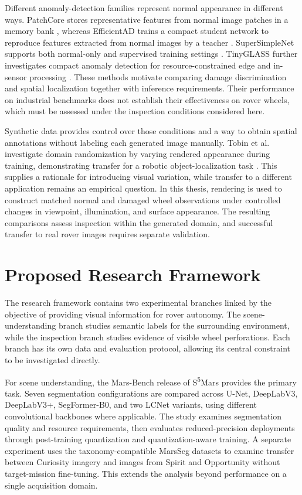 Different anomaly-detection families represent normal appearance in different ways. PatchCore stores representative features from normal image patches in a memory bank \cite{roth2022patchcore}, whereas EfficientAD trains a compact student network to reproduce features extracted from normal images by a teacher \cite{batzner2024efficientad}. SuperSimpleNet supports both normal-only and supervised training settings \cite{rolih2025supersimplenet}. TinyGLASS further investigates compact anomaly detection for resource-constrained edge and in-sensor processing \cite{bonazzi2026tinyglass}. These methods motivate comparing damage discrimination and spatial localization together with inference requirements. Their performance on industrial benchmarks does not establish their effectiveness on rover wheels, which must be assessed under the inspection conditions considered here.

Synthetic data provides control over those conditions and a way to obtain spatial annotations without labeling each generated image manually. Tobin et al. investigate domain randomization by varying rendered appearance during training, demonstrating transfer for a robotic object-localization task \cite{tobin2017domain}. This supplies a rationale for introducing visual variation, while transfer to a different application remains an empirical question. In this thesis, rendering is used to construct matched normal and damaged wheel observations under controlled changes in viewpoint, illumination, and surface appearance. The resulting comparisons assess inspection within the generated domain, and successful transfer to real rover images requires separate validation.

\section{Proposed Research Framework}

The research framework contains two experimental branches linked by the objective of providing visual information for rover autonomy. The scene-understanding branch studies semantic labels for the surrounding environment, while the inspection branch studies evidence of visible wheel perforations. Each branch has its own data and evaluation protocol, allowing its central constraint to be investigated directly.

For scene understanding, the Mars-Bench release of S\textsuperscript{5}Mars provides the primary task. Seven segmentation configurations are compared across U-Net, DeepLabV3, DeepLabV3+, SegFormer-B0, and two LCNet variants, using different convolutional backbones where applicable. The study examines segmentation quality and resource requirements, then evaluates reduced-precision deployments through post-training quantization and quantization-aware training. A separate experiment uses the taxonomy-compatible MarsSeg datasets to examine transfer between Curiosity imagery and images from Spirit and Opportunity without target-mission fine-tuning. This extends the analysis beyond performance on a single acquisition domain.


